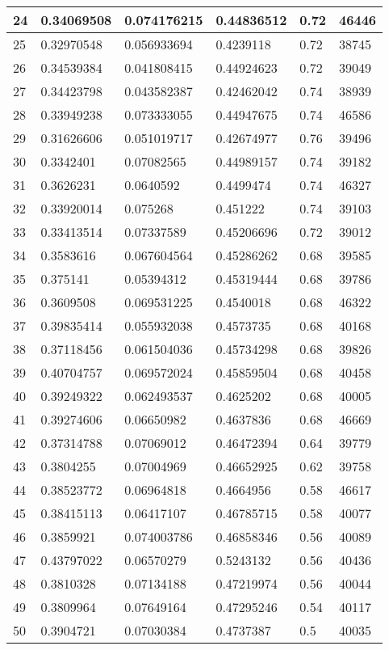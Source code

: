 \begin{longtable}{|l|l|l|l|l|l|}
24 & 0.34069508 & 0.074176215 & 0.44836512 & 0.72 & 46446 \\ \hline 
25 & 0.32970548 & 0.056933694 & 0.4239118 & 0.72 & 38745 \\ \hline 
26 & 0.34539384 & 0.041808415 & 0.44924623 & 0.72 & 39049 \\ \hline 
27 & 0.34423798 & 0.043582387 & 0.42462042 & 0.74 & 38939 \\ \hline 
28 & 0.33949238 & 0.073333055 & 0.44947675 & 0.74 & 46586 \\ \hline 
29 & 0.31626606 & 0.051019717 & 0.42674977 & 0.76 & 39496 \\ \hline 
30 & 0.3342401 & 0.07082565 & 0.44989157 & 0.74 & 39182 \\ \hline 
31 & 0.3626231 & 0.0640592 & 0.4499474 & 0.74 & 46327 \\ \hline 
32 & 0.33920014 & 0.075268 & 0.451222 & 0.74 & 39103 \\ \hline 
33 & 0.33413514 & 0.07337589 & 0.45206696 & 0.72 & 39012 \\ \hline 
34 & 0.3583616 & 0.067604564 & 0.45286262 & 0.68 & 39585 \\ \hline 
35 & 0.375141 & 0.05394312 & 0.45319444 & 0.68 & 39786 \\ \hline 
36 & 0.3609508 & 0.069531225 & 0.4540018 & 0.68 & 46322 \\ \hline 
37 & 0.39835414 & 0.055932038 & 0.4573735 & 0.68 & 40168 \\ \hline 
38 & 0.37118456 & 0.061504036 & 0.45734298 & 0.68 & 39826 \\ \hline 
39 & 0.40704757 & 0.069572024 & 0.45859504 & 0.68 & 40458 \\ \hline 
40 & 0.39249322 & 0.062493537 & 0.4625202 & 0.68 & 40005 \\ \hline 
41 & 0.39274606 & 0.06650982 & 0.4637836 & 0.68 & 46669 \\ \hline 
42 & 0.37314788 & 0.07069012 & 0.46472394 & 0.64 & 39779 \\ \hline 
43 & 0.3804255 & 0.07004969 & 0.46652925 & 0.62 & 39758 \\ \hline 
44 & 0.38523772 & 0.06964818 & 0.4664956 & 0.58 & 46617 \\ \hline 
45 & 0.38415113 & 0.06417107 & 0.46785715 & 0.58 & 40077 \\ \hline 
46 & 0.3859921 & 0.074003786 & 0.46858346 & 0.56 & 40089 \\ \hline 
47 & 0.43797022 & 0.06570279 & 0.5243132 & 0.56 & 40436 \\ \hline 
48 & 0.3810328 & 0.07134188 & 0.47219974 & 0.56 & 40044 \\ \hline 
49 & 0.3809964 & 0.07649164 & 0.47295246 & 0.54 & 40117 \\ \hline 
50 & 0.3904721 & 0.07030384 & 0.4737387 & 0.5 & 40035 \\ \hline 
\end{longtable}